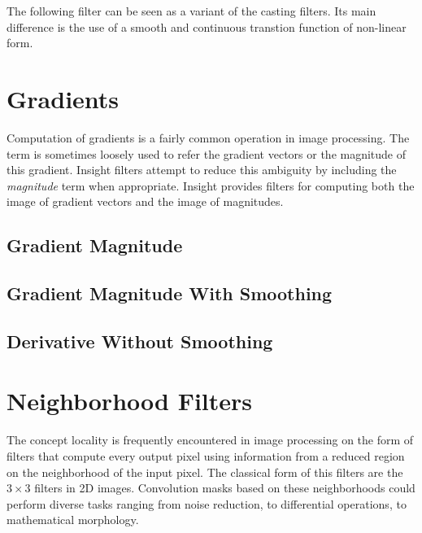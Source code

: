 The following filter can be seen as a variant of the casting filters. Its main
difference is the use of a smooth and continuous transtion function of
non-linear form.


  

\section{Gradients}
\label{sec:GradientFiltering}

Computation of gradients is a fairly common operation in image processing. The
term is sometimes loosely used to refer the gradient vectors or the magnitude
of this gradient. Insight filters attempt to reduce this ambiguity by including
the \emph{magnitude} term when appropriate. Insight provides filters for
computing both the image of gradient vectors and the image of magnitudes.

\subsection{Gradient Magnitude}
\label{sec:GradientMagnitudeImageFilter}



\subsection{Gradient Magnitude With Smoothing}
\label{sec:GradientMagnitudeRecursiveGaussianImageFilter}




\subsection{Derivative Without Smoothing}
\label{sec:DerivativeImageFilter}






\section{Neighborhood Filters}
\label{sec:NeighborhoodFilters}

The concept locality is frequently encountered in image processing on the form
of filters that compute every output pixel using information from a reduced
region on the neighborhood of the input pixel. The classical form of this
filters are the $3 \times 3$ filters in 2D images. Convolution masks based on
these neighborhoods could perform diverse tasks ranging from noise reduction,
to differential operations, to mathematical morphology.

